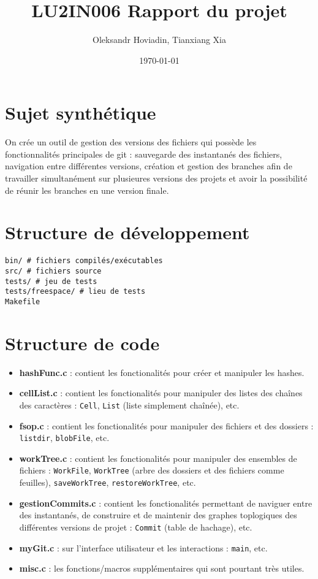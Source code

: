 \documentclass{report}
\title{LU2IN006 Rapport du projet}
\author{Oleksandr Hoviadin, Tianxiang Xia}
\date{\today}
\begin{document}
\maketitle
\section*{Sujet synthétique}
On crée un outil de gestion des versions des fichiers
qui possède les fonctionnalités principales de git : sauvegarde des instantanés
des fichiers, navigation entre différentes versions,
création et gestion des branches afin de travailler simultanément
sur plusieures versions des projets et avoir la possibilité de réunir les branches en une version finale.

\section*{Structure de développement}

\begin{verbatim}
bin/ # fichiers compilés/exécutables
src/ # fichiers source
tests/ # jeu de tests
tests/freespace/ # lieu de tests
Makefile
\end{verbatim}

\section*{Structure de code}
\begin{itemize}
    \item \textbf{hashFunc.c} : contient les fonctionalités pour créer et manipuler les hashes.
    \item \textbf{cellList.c} : contient les fonctionalités pour manipuler des listes des chaînes des caractères : \verb|Cell|, \verb|List| (liste simplement chaînée), etc.
    \item \textbf{fsop.c} : contient les fonctionalités pour manipuler des fichiers et des dossiers : \verb|listdir|, \verb|blobFile|, etc.
    \item \textbf{workTree.c} : contient les fonctionalités pour manipuler des ensembles de fichiers : \verb|WorkFile|,
    \verb|WorkTree| (arbre des dossiers et des fichiers comme feuilles),
    \verb|saveWorkTree|, \verb|restoreWorkTree|, etc.
    \item \textbf{gestionCommits.c} : contient les fonctionalités permettant de naviguer entre des instantanés, de construire
    et de maintenir des graphes toplogiques des différentes versions de projet :
    \verb|Commit| (table de hachage), etc.
    \item\textbf{myGit.c} : sur l'interface utilisateur et les interactions : \verb|main|, etc.
    \item\textbf{misc.c} : les fonctions/macros supplémentaires qui sont pourtant très utiles.
\end{itemize}
\end{document}
